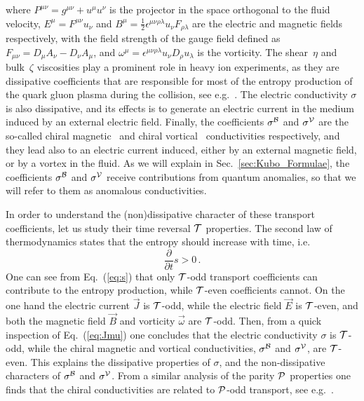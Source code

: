 \documentclass[a4paper]{jpconf}
\begin{document}
where $P^{\mu\nu} = g^{\mu\nu} + u^\mu u^\nu$ is the projector in the space orthogonal to the fluid velocity, $E^\mu = F^{\mu\nu} u_\nu$ and $B^\mu = \frac{1}{2}\epsilon^{\mu\nu\rho\lambda} u_\nu F_{\rho\lambda}$ are the electric and magnetic fields respectively, with the field strength of the gauge field defined as $F_{\mu\nu} = D_\mu A_\nu - D_\nu A_\mu$, and  $\omega^\mu = \epsilon^{\mu\nu\rho\lambda}u_\nu D_\rho u_\lambda$ is the vorticity. The shear~$\eta$ and bulk~$\zeta$ viscosities play a prominent role in heavy ion experiments, as they are dissipative coefficients that are responsible for most of the entropy production of the quark gluon plasma during the collision, see e.g.~\cite{Bozek:2009dw}. The electric conductivity $\sigma$ is also dissipative, and its effects is to generate an electric current in the medium induced by an external electric field. Finally, the coefficients $\sigma^{\cal B}$ and $\sigma^{\cal V}$ are the so-called chiral magnetic~\cite{Fukushima:2008xe} and chiral vortical~\cite{Son:2009tf} conductivities respectively, and they lead also to an electric current induced, either by an external magnetic field, or by a vortex in the fluid. As we will explain in Sec.~\ref{sec:Kubo_Formulae}, the coefficients $\sigma^{\cal B}$ and $\sigma^{\cal V}$ receive contributions from quantum anomalies, so that we will refer to them as anomalous conductivities.

In order to understand the (non)dissipative character of these transport coefficients, let us study their time reversal ${\cal T}$ properties. The second law of thermodynamics states that the entropy should increase with time, i.e.
\begin{equation}
\frac{\partial }{\partial t} s > 0 \,. \label{eq:s}
\end{equation}
One can see from Eq.~(\ref{eq:s}) that only ${\cal T}$-odd transport coefficients can contribute to the entropy production, while ${\cal T}$-even coefficients cannot. On the one hand the electric current $\vec{J}$ is ${\cal T}$-odd, while the electric field $\vec{E}$ is ${\cal T}$-even, and both the magnetic field $\vec{B}$ and vorticity $\vec{\omega}$ are ${\cal T}$-odd. Then, from a quick inspection of Eq.~(\ref{eq:Jmu}) one concludes that the electric conductivity $\sigma$ is ${\cal T}$-odd, while the chiral magnetic and vortical conductivities, $\sigma^{\cal B}$ and $\sigma^{\cal V}$, are ${\cal T}$-even. This explains the dissipative properties of $\sigma$, and the non-dissipative characters of $\sigma^{\cal B}$ and $\sigma^{\cal V}$. From a similar analysis of the parity ${\cal P}$ properties one finds that the chiral conductivities are related to ${\cal P}$-odd transport, see e.g.~\cite{Kharzeev:2011ds}.
\end{document}

